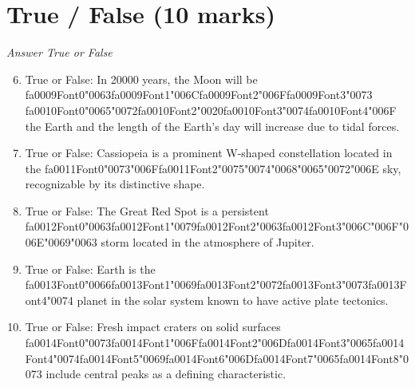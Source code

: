 \documentclass[12pt]{article}
\begin{document}
\section*{True / False (10 marks)}
\textit{Answer True or False}
\begin{enumerate}[label=\arabic*.]
\setcounter{enumi}{5}
\item True or False: In 20000 years, the Moon will be {\csname fa0009Font0\endcsname\char"0063}{\csname fa0009Font1\endcsname\char"006C}{\csname fa0009Font2\endcsname\char"006F}{\csname fa0009Font3\endcsname\char"0073} {\csname fa0010Font0\endcsname\char"0065}{\char"0072}{\csname fa0010Font2\endcsname\char"0020}{\csname fa0010Font3\endcsname\char"0074}{\csname fa0010Font4\endcsname\char"006F} the Earth and the length of the Earth's day will increase due to tidal forces.
\item True or False: Cassiopeia is a prominent W-shaped constellation located in the {\csname fa0011Font0\endcsname\char"0073}{\char"006F}{\csname fa0011Font2\endcsname\char"0075}{\char"0074}{\char"0068}{\char"0065}{\char"0072}{\char"006E} sky, recognizable by its distinctive shape.
\item True or False: The Great Red Spot is a persistent {\csname fa0012Font0\endcsname\char"0063}{\csname fa0012Font1\endcsname\char"0079}{\csname fa0012Font2\endcsname\char"0063}{\csname fa0012Font3\endcsname\char"006C}{\char"006F}{\char"006E}{\char"0069}{\char"0063} storm located in the atmosphere of Jupiter.
\item True or False: Earth is the {\csname fa0013Font0\endcsname\char"0066}{\csname fa0013Font1\endcsname\char"0069}{\csname fa0013Font2\endcsname\char"0072}{\csname fa0013Font3\endcsname\char"0073}{\csname fa0013Font4\endcsname\char"0074} planet in the solar system known to have active plate tectonics.
\item True or False: Fresh impact craters on solid surfaces {\csname fa0014Font0\endcsname\char"0073}{\csname fa0014Font1\endcsname\char"006F}{\csname fa0014Font2\endcsname\char"006D}{\csname fa0014Font3\endcsname\char"0065}{\csname fa0014Font4\endcsname\char"0074}{\csname fa0014Font5\endcsname\char"0069}{\csname fa0014Font6\endcsname\char"006D}{\csname fa0014Font7\endcsname\char"0065}{\csname fa0014Font8\endcsname\char"0073} include central peaks as a defining characteristic.
\end{enumerate}
\end{document}
